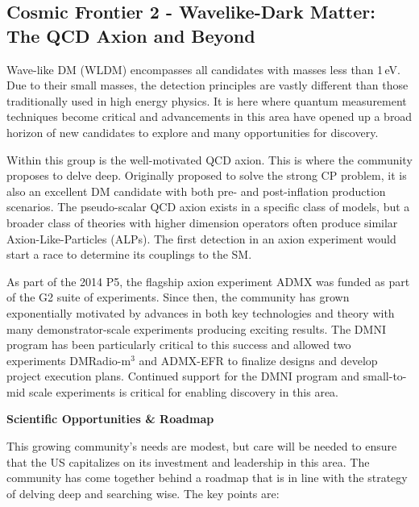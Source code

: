 \documentclass[nofootinbib]{article}
\begin{document}
\subsection{Cosmic Frontier 2 - Wavelike-Dark Matter: The QCD Axion and Beyond}

Wave-like DM (WLDM) encompasses all candidates with masses less than 1\,eV. Due to their small masses, the detection principles are vastly different than those traditionally used in high energy physics. It is here where quantum measurement techniques become critical and advancements in this area have opened up a broad horizon of new candidates to explore and many opportunities for discovery. 

Within this group is the well-motivated QCD axion. This is where the community proposes to delve deep. Originally proposed to solve the strong CP problem, it is also an excellent DM candidate with both pre- and post-inflation production scenarios. The pseudo-scalar QCD axion exists in a specific class of models, but a broader class of theories with higher dimension operators often produce similar Axion-Like-Particles (ALPs). The first detection in an axion experiment would start a race to determine its couplings to the SM.   

As part of the 2014 P5, the flagship axion experiment ADMX was funded as part of the G2 suite of experiments. Since then, the community has grown exponentially motivated by advances in both key technologies and theory with many demonstrator-scale experiments producing exciting results. The DMNI program has been particularly critical to this success and allowed two experiments DMRadio-m$^3$ and ADMX-EFR to finalize designs and develop project execution plans. Continued support for the DMNI program and small-to-mid scale experiments is critical for enabling discovery in this area.    


\vspace{1em}
\noindent \textbf{Scientific Opportunities \& Roadmap} 

This growing community's needs are modest, but care will be needed to ensure that the US capitalizes on its investment and leadership in this area. The community has come together behind a roadmap that is in line with the strategy of delving deep and searching wise. The key points are:
\end{document}
